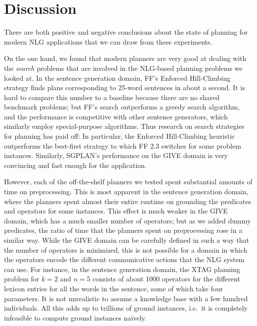 \section{Discussion}
\label{sec:discussion}

There are both positive and negative conclusions about the state of
planning for modern NLG applications that we can draw from these
experiments.

On the one hand, we found that modern planners are very good at
dealing with the \emph{search} problems that are involved in the
NLG-based planning problems we looked at. In the sentence generation
domain, FF's Enforced Hill-Climbing strategy finds plans corresponding
to 25-word sentences in about a second. It is hard to compare this
number to a baseline because there are no shared benchmark problems;
but FF's search outperforms a greedy search algorithm, and the
performance is competitive with other sentence generators, which
similarly employ special-purpose algorithms. Thus research on search
strategies for planning has paid off: In particular, the Enforced
Hill-Climbing heuristic outperforms the best-first strategy to which
FF 2.3 switches for some problem instances. Similarly, SGPLAN's
performance on the GIVE domain is very convincing and fast enough for
the application.

However, each of the off-the-shelf planners we tested spent
substantial amounts of time on preprocessing. This is most apparent in
the sentence generation domain, where the planners spent almost their
entire runtime on grounding the predicates and operators for some
instances. This effect is much weaker in the GIVE domain, which has a
much smaller number of operators; but as we added dummy predicates,
the ratio of time that the planners spent on preprocessing rose in a
similar way. While the GIVE domain can be carefully defined in such a
way that the number of operators is minimized, this is not possible
for a domain in which the operators encode the different communicative
actions that the NLG system can use. For instance, in the sentence
generation domain, the XTAG planning problem for $k=2$ and $n=5$
consists of about 1000 operators for the different lexicon entries for
all the words in the sentence, some of which take four parameters. It
is not unrealistic to assume a knowledge base with a few hundred
individuals. All this adds up to trillions of ground instances, i.e.\
it is completely infeasible to compute ground instances naively.

